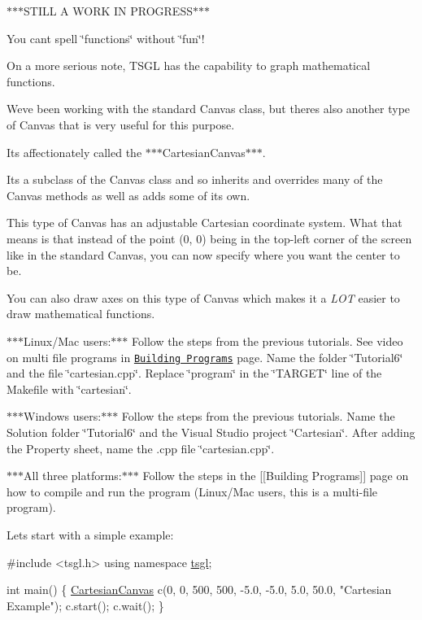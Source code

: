 $\ast$$\ast$$\ast$\+S\+T\+I\+L\+L A W\+O\+R\+K I\+N P\+R\+O\+G\+R\+E\+S\+S$\ast$$\ast$$\ast$

You can\textquotesingle{}t spell \char`\"{}functions\char`\"{} without \char`\"{}fun\char`\"{}!

On a more serious note, T\+S\+G\+L has the capability to graph mathematical functions.

We\textquotesingle{}ve been working with the standard Canvas class, but there\textquotesingle{}s also another type of Canvas that is very useful for this purpose.

It\textquotesingle{}s affectionately called the $\ast$$\ast$$\ast$\+Cartesian\+Canvas$\ast$$\ast$$\ast$.

Its a subclass of the Canvas class and so inherits and overrides many of the Canvas methods as well as adds some of its own.

This type of Canvas has an adjustable Cartesian coordinate system. What that means is that instead of the point (0, 0) being in the top-\/left corner of the screen like in the standard Canvas, you can now specify where you want the center to be.

You can also draw axes on this type of Canvas which makes it a {\itshape L\+O\+T} easier to draw mathematical functions.

$\ast$$\ast$$\ast$\+Linux/\+Mac users\+:$\ast$$\ast$$\ast$ Follow the steps from the previous tutorials. See video on multi file programs in \href{https://github.com/Calvin-CS/TSGL/wiki/Building-Programs}{\tt Building Programs} page. Name the folder \char`\"{}\+Tutorial6\char`\"{} and the file \char`\"{}cartesian.\+cpp\char`\"{}. Replace \char`\"{}program\char`\"{} in the \char`\"{}\+T\+A\+R\+G\+E\+T\char`\"{} line of the Makefile with \char`\"{}cartesian\char`\"{}.

$\ast$$\ast$$\ast$\+Windows users\+:$\ast$$\ast$$\ast$ Follow the steps from the previous tutorials. Name the Solution folder \char`\"{}\+Tutorial6\char`\"{} and the Visual Studio project \char`\"{}\+Cartesian\char`\"{}. After adding the Property sheet, name the .cpp file \char`\"{}cartesian.\+cpp\char`\"{}.

$\ast$$\ast$$\ast$\+All three platforms\+:$\ast$$\ast$$\ast$ Follow the steps in the \mbox{[}\mbox{[}Building Programs\mbox{]}\mbox{]} page on how to compile and run the program (Linux/\+Mac users, this is a multi-\/file program).

Let\textquotesingle{}s start with a simple example\+:


\begin{DoxyCode}
\textcolor{preprocessor}{#include <tsgl.h>}
\textcolor{keyword}{using namespace }\hyperlink{namespacetsgl}{tsgl};

\textcolor{keywordtype}{int} main() \{
  \hyperlink{classtsgl_1_1_cartesian_canvas}{CartesianCanvas} c(0, 0, 500, 500, -5.0, -5.0, 5.0, 50.0, \textcolor{stringliteral}{"Cartesian Example"});
  c.start();
  c.wait();
\}
\end{DoxyCode}


